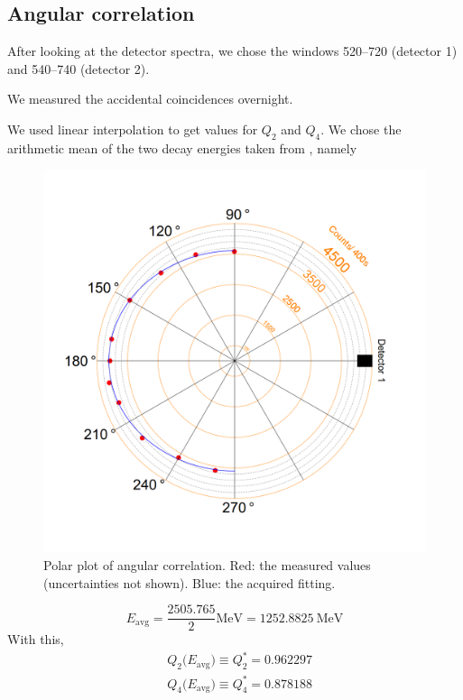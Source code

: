 \documentclass[twocolumn]{article}
\begin{document}
\subsection{Angular correlation}
After looking at the detector spectra, we chose the windows 520--720 (detector 1) and 540--740 (detector 2).
\par We measured the accidental coincidences overnight.
\par We used linear interpolation to get values for $Q_2$ and $Q_4$. We chose the arithmetic mean of the two decay energies taken from \cite{cobalt_scheme}, namely
\begin{figure}
\centering\includegraphics[width=1.1\linewidth]{polar.png}
\caption{Polar plot of angular correlation. Red: the measured values (uncertainties not shown). Blue: the acquired fitting.}
\label{fig:polar}
\end{figure}
\begin{equation}
E_{\text{avg}} = \frac{2505.765}{2} \si{\mega \electronvolt} = \SI{1252.8825}{\mega\electronvolt} \nonumber
\end{equation}
With this,
\begin{align*}
&Q_2\big(E_{\text{avg}}\big) \equiv Q^*_2 = 0.962297\\
&Q_4\big(E_{\text{avg}}\big) \equiv Q^*_4 = 0.878188
\end{align*}
\end{document}
